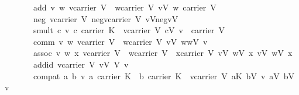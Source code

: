 \begin{isabellebody}
\ \ \ \ \ \ \ add{\isacharcolon}\ {\isachardoublequoteopen}{\isasymforall}v\ w{\isachardot}\ v{\isasymin}carrier\ V\ {\isasymand}\ w{\isasymin}carrier\ V{\isasymlongrightarrow}\ v{\isasymoplus}\isactrlbsub V\isactrlesub \ w{\isasymin}\ carrier\ V{\isachardoublequoteclose}\isanewline
\ \ \ \ \ \ \ neg{\isacharcolon}\ {\isachardoublequoteopen}{\isasymforall}v{\isasymin}carrier\ V{\isachardot}\ {\isacharparenleft}{\isasymexists}neg{\isacharunderscore}v{\isasymin}carrier\ V{\isachardot}\ v{\isasymoplus}\isactrlbsub V\isactrlesub neg{\isacharunderscore}v{\isacharequal}{\isasymzero}\isactrlbsub V\isactrlesub {\isacharparenright}{\isachardoublequoteclose}\isanewline
\ \ \ \ \ \ \ smult{\isacharcolon}\ {\isachardoublequoteopen}{\isasymforall}c\ v{\isachardot}\ c{\isasymin}\ carrier\ K\ {\isasymand}\ v{\isasymin}carrier\ V{\isasymlongrightarrow}\ c{\isasymodot}\isactrlbsub V\isactrlesub \ v\ {\isasymin}\ carrier\ V{\isachardoublequoteclose}\isanewline
\ \ \ \ \ \ \ comm{\isacharcolon}\ {\isachardoublequoteopen}{\isasymforall}v\ w{\isachardot}\ v{\isasymin}carrier\ V\ {\isasymand}\ w{\isasymin}carrier\ V{\isasymlongrightarrow}\ v{\isasymoplus}\isactrlbsub V\isactrlesub \ w{\isacharequal}w{\isasymoplus}\isactrlbsub V\isactrlesub \ v{\isachardoublequoteclose}\isanewline
\ \ \ \ \ \ \ assoc{\isacharcolon}\ {\isachardoublequoteopen}{\isasymforall}v\ w\ x{\isachardot}\ v{\isasymin}carrier\ V\ {\isasymand}\ w{\isasymin}carrier\ V\ {\isasymand}\ x{\isasymin}carrier\ V{\isasymlongrightarrow}\ {\isacharparenleft}v{\isasymoplus}\isactrlbsub V\isactrlesub \ w{\isacharparenright}{\isasymoplus}\isactrlbsub V\isactrlesub \ x{\isacharequal}\ v{\isasymoplus}\isactrlbsub V\isactrlesub \ {\isacharparenleft}w{\isasymoplus}\isactrlbsub V\isactrlesub \ x{\isacharparenright}{\isachardoublequoteclose}\isanewline
\ \ \ \ \ \ \ add{\isacharunderscore}id{\isacharcolon}\ {\isachardoublequoteopen}{\isasymforall}v{\isasymin}carrier\ V{\isachardot}\ {\isacharparenleft}v{\isasymoplus}\isactrlbsub V\isactrlesub \ {\isasymzero}\isactrlbsub V\isactrlesub \ {\isacharequal}v{\isacharparenright}{\isachardoublequoteclose}\isanewline
\ \ \ \ \ \ \ compat{\isacharcolon}\ {\isachardoublequoteopen}{\isasymforall}a\ b\ v{\isachardot}\ a{\isasymin}\ carrier\ K\ {\isasymand}\ b{\isasymin}\ carrier\ K\ {\isasymand}\ v{\isasymin}carrier\ V{\isasymlongrightarrow}\ {\isacharparenleft}a{\isasymotimes}\isactrlbsub K\isactrlesub \ b{\isacharparenright}{\isasymodot}\isactrlbsub V\isactrlesub \ v\ {\isacharequal}a{\isasymodot}\isactrlbsub V\isactrlesub \ {\isacharparenleft}b{\isasymodot}\isactrlbsub V\isactrlesub \ v{\isacharparenright}{\isachardoublequoteclose}\isanewline

\end{isabellebody}
